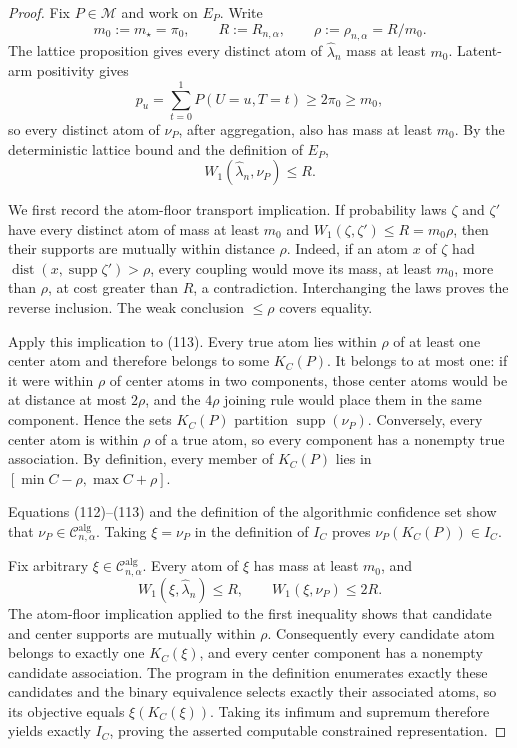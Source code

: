 \documentclass{article}
\begin{document}
\begin{proof}
Fix \(P\in\mathcal M\) and work on \(E_P\).  Write
\[
m_0:=m_\star=\pi_0,
\qquad R:=R_{n,\alpha},
\qquad \rho:=\rho_{n,\alpha}=R/m_0.                                  \tag{111}
\]
The lattice proposition gives every distinct atom of \(\widehat\lambda_n\) mass at least \(m_0\).  Latent-arm positivity gives
\[
p_u=\sum_{t=0}^1P(U=u,T=t)\ge2\pi_0\ge m_0,                          \tag{112}
\]
so every distinct atom of \(\nu_P\), after aggregation, also has mass at least \(m_0\).  By the deterministic lattice bound and the definition of \(E_P\),
\[
W_1(\widehat\lambda_n,\nu_P)\le R.                                  \tag{113}
\]

We first record the atom-floor transport implication.  If probability laws \(\zeta\) and \(\zeta'\) have every distinct atom of mass at least \(m_0\) and \(W_1(\zeta,\zeta')\le R=m_0\rho\), then their supports are mutually within distance \(\rho\).  Indeed, if an atom \(x\) of \(\zeta\) had \(\operatorname{dist}(x,\operatorname{supp}\zeta')>\rho\), every coupling would move its mass, at least \(m_0\), more than \(\rho\), at cost greater than \(R\), a contradiction.  Interchanging the laws proves the reverse inclusion.  The weak conclusion \(\le\rho\) covers equality.

Apply this implication to (113).  Every true atom lies within \(\rho\) of at least one center atom and therefore belongs to some \(K_C(P)\).  It belongs to at most one: if it were within \(\rho\) of center atoms in two components, those center atoms would be at distance at most \(2\rho\), and the \(4\rho\) joining rule would place them in the same component.  Hence the sets \(K_C(P)\) partition \(\operatorname{supp}(\nu_P)\).  Conversely, every center atom is within \(\rho\) of a true atom, so every component has a nonempty true association.  By definition, every member of \(K_C(P)\) lies in \([\min C-\rho,\max C+\rho]\).

Equations (112)--(113) and the definition of the algorithmic confidence set show that \(\nu_P\in\mathcal C^{\mathrm{alg}}_{n,\alpha}\).  Taking \(\xi=\nu_P\) in the definition of \(I_C\) proves \(\nu_P(K_C(P))\in I_C\).

Fix arbitrary \(\xi\in\mathcal C^{\mathrm{alg}}_{n,\alpha}\).  Every atom of \(\xi\) has mass at least \(m_0\), and
\[
W_1(\xi,\widehat\lambda_n)\le R,
\qquad W_1(\xi,\nu_P)\le2R.                                        \tag{114}
\]
The atom-floor implication applied to the first inequality shows that candidate and center supports are mutually within \(\rho\).  Consequently every candidate atom belongs to exactly one \(K_C(\xi)\), and every center component has a nonempty candidate association.  The program in the definition enumerates exactly these candidates and the binary equivalence selects exactly their associated atoms, so its objective equals \(\xi(K_C(\xi))\).  Taking its infimum and supremum therefore yields exactly \(I_C\), proving the asserted computable constrained representation.


\end{proof}
\end{document}
